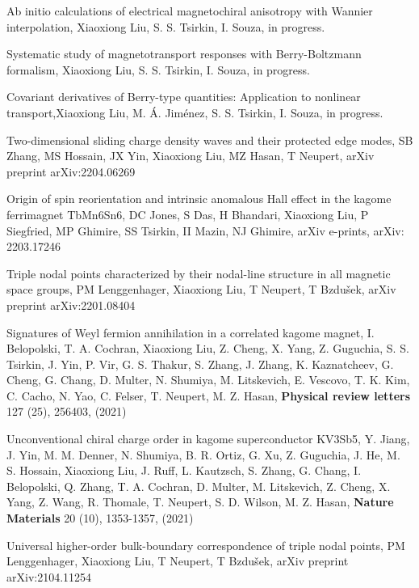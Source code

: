 \documentclass[11pt,a4paper,sans]{moderncv} %
\begin{document}
\begin{etaremune}
  \item Ab initio calculations of electrical magnetochiral anisotropy with Wannier interpolation, \textcolor{cvblue}{Xiaoxiong Liu}, S. S. Tsirkin, I. Souza, in progress.
  \item Systematic study of magnetotransport responses with Berry-Boltzmann formalism, \textcolor{cvblue}{Xiaoxiong Liu}, S. S. Tsirkin, I. Souza, in progress.
  \item Covariant derivatives of Berry-type quantities: Application to nonlinear transport,\textcolor{cvblue}{Xiaoxiong Liu}, M. Á. Jiménez, S. S. Tsirkin, I. Souza, in progress.
  \item Two-dimensional sliding charge density waves and their protected edge modes, SB Zhang, MS Hossain, JX Yin, \textcolor{cvblue}{Xiaoxiong Liu}, MZ Hasan, T Neupert, arXiv preprint arXiv:2204.06269
  \item Origin of spin reorientation and intrinsic anomalous Hall effect in the kagome ferrimagnet TbMn6Sn6, DC Jones, S Das, H Bhandari, \textcolor{cvblue}{Xiaoxiong Liu}, P Siegfried, MP Ghimire, SS Tsirkin, II Mazin, NJ Ghimire, arXiv e-prints, arXiv: 2203.17246
  \item Triple nodal points characterized by their nodal-line structure in all magnetic space groups, PM Lenggenhager, \textcolor{cvblue}{Xiaoxiong Liu}, T Neupert, T Bzdušek, arXiv preprint arXiv:2201.08404
  \item Signatures of Weyl fermion annihilation in a correlated kagome magnet, I. Belopolski, T. A. Cochran, \textcolor{cvblue}{Xiaoxiong Liu}, Z. Cheng, X. Yang, Z. Guguchia, S. S. Tsirkin, J. Yin, P. Vir, G. S. Thakur, S. Zhang, J. Zhang, K. Kaznatcheev, G. Cheng, G. Chang, D. Multer, N. Shumiya, M. Litskevich, E. Vescovo, T. K. Kim, C. Cacho, N. Yao, C. Felser, T. Neupert, M. Z. Hasan, \textbf{Physical review letters} 127 (25), 256403, (2021)
  \item Unconventional chiral charge order in kagome superconductor KV3Sb5, Y. Jiang, J. Yin, M. M. Denner, N. Shumiya, B. R. Ortiz, G. Xu, Z. Guguchia, J. He, M. S. Hossain, \textcolor{cvblue}{Xiaoxiong Liu}, J. Ruff, L. Kautzsch, S. Zhang, G. Chang, I. Belopolski, Q. Zhang, T. A. Cochran, D. Multer, M. Litskevich, Z. Cheng, X. Yang, Z. Wang, R. Thomale, T. Neupert, S. D. Wilson, M. Z. Hasan, \textbf{Nature Materials} 20 (10), 1353-1357, (2021)
  \item Universal higher-order bulk-boundary correspondence of triple nodal points, PM Lenggenhager, \textcolor{cvblue}{Xiaoxiong Liu}, T Neupert, T Bzdušek, arXiv preprint arXiv:2104.11254

\end{etaremune}
\end{document}
